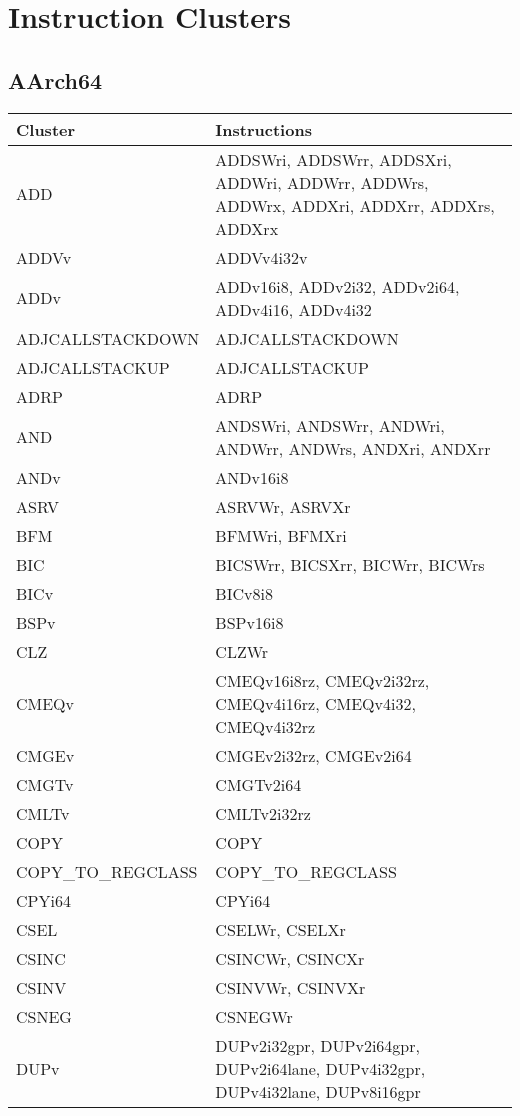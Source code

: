 \chapter{Instruction Clusters}
\section{AArch64}
\begin{xltabular}{\textwidth}{lX}
    \toprule
    Cluster & Instructions \\
    \midrule
    \endhead

    \bottomrule
    \endfoot

    ADD & ADDSWri, ADDSWrr, ADDSXri, ADDWri, ADDWrr, ADDWrs, ADDWrx, ADDXri, ADDXrr, ADDXrs, ADDXrx \\
    ADDVv & ADDVv4i32v \\
    ADDv & ADDv16i8, ADDv2i32, ADDv2i64, ADDv4i16, ADDv4i32 \\
    ADJCALLSTACKDOWN & ADJCALLSTACKDOWN \\
    ADJCALLSTACKUP & ADJCALLSTACKUP \\
    ADRP & ADRP \\
    AND & ANDSWri, ANDSWrr, ANDWri, ANDWrr, ANDWrs, ANDXri, ANDXrr \\
    ANDv & ANDv16i8 \\
    ASRV & ASRVWr, ASRVXr \\
    BFM & BFMWri, BFMXri \\
    BIC & BICSWrr, BICSXrr, BICWrr, BICWrs \\
    BICv & BICv8i8 \\
    BSPv & BSPv16i8 \\
    CLZ & CLZWr \\
    CMEQv & CMEQv16i8rz, CMEQv2i32rz, CMEQv4i16rz, CMEQv4i32, CMEQv4i32rz \\
    CMGEv & CMGEv2i32rz, CMGEv2i64 \\
    CMGTv & CMGTv2i64 \\
    CMLTv & CMLTv2i32rz \\
    COPY & COPY \\
    COPY\_TO\_REGCLASS & COPY\_TO\_REGCLASS \\
    CPYi64 & CPYi64 \\
    CSEL & CSELWr, CSELXr \\
    CSINC & CSINCWr, CSINCXr \\
    CSINV & CSINVWr, CSINVXr \\
    CSNEG & CSNEGWr \\
    DUPv & DUPv2i32gpr, DUPv2i64gpr, DUPv2i64lane, DUPv4i32gpr, DUPv4i32lane, DUPv8i16gpr \\

\end{xltabular}
